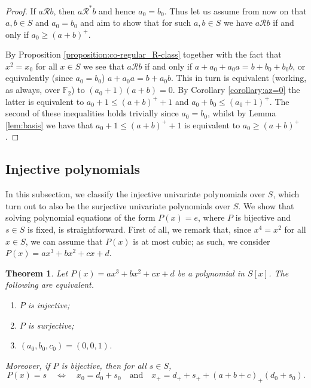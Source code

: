 \documentclass[a4paper, 11pt]{article}
\theoremstyle{plain}
\newtheorem{theorem}{Theorem}[section]
\theoremstyle{definition}
\begin{document}
\begin{proof}
If $a \mathcal{R} b$, then $a \mathcal{R}^* b$ and hence $a_0 = b_0$. Thus let us assume from now on that $a, b \in S$ and $a_0=b_0$ and aim to show that for such $a,b \in S$ we have $a \mathcal{R} b$ if and only if $a_0 \geq (a+b)^+$.

By Proposition \ref{proposition:co-regular_R-class} together with the fact that $x^2 = x_0$ for all $x \in S$ we see that $a \mathcal{R} b$ if and only if $a + a_0 + a_0a = b + b_0 + b_0b$, or equivalently (since $a_0=b_0$) $a + a_0a = b + a_0b$. This in turn is equivalent (working, as always, over $\mathbb{F}_2$) to $(a_0+1)(a+b) = 0$. By Corollary \ref{corollary:az=0} the latter is equivalent to
$a_0 + 1 \leq (a+b)^+ + 1$ and $a_0+b_0 \leq (a_0 + 1)^+$. The second of these inequalities holds trivially since $a_0=b_0$, whilst by Lemma \ref{lem:basis} we have that $a_0+1 \leq (a+b)^+ + 1$ is equivalent to $a_0 \geq (a+b)^+$.
\end{proof}







\subsection{Injective polynomials} \label{subsection:injective_polynomials}

In this subsection, we classify the injective univariate polynomials over $S$, which turn out to also be the surjective univariate polynomials over $S$. We show that solving polynomial equations of the form $P(x) = e$, where $P$ is bijective and $s \in S$ is fixed, is straightforward. First of all, we remark that, since $x^4 = x^2$ for all $x \in S$, we can assume that $P(x)$ is at most cubic; as such, we consider $P(x) = a x^3 + b x^2 + c x + d$.

\begin{theorem} \label{theorem:injective_polynomials}
Let $P(x) = a x^3 + b x^2 + c x + d$ be a polynomial in $S[x]$. The following are equivalent.
\begin{enumerate}
    \item $P$ is injective;

    \item $P$ is surjective;

    \item $(a_0, b_0, c_0) = (0,0,1)$.
\end{enumerate}
Moreover, if $P$ is bijective, then for all $s \in S$,
\[
    P(x) = s \quad \iff \quad x_0 = d_0 + s_0 \quad \text{and} \quad x_+ = d_+ + s_+ + (a + b + c)_+ (d_0 + s_0).
\]
\end{theorem}
\end{document}
